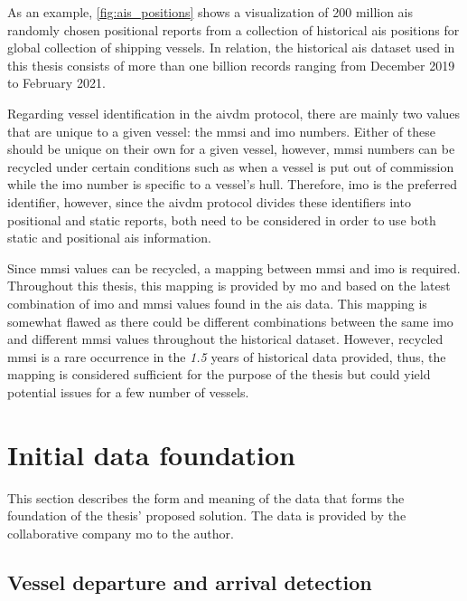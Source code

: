 As an example, \cref{fig:ais_positions} shows a visualization of 200 million \acrshort{ais} randomly chosen positional reports from a collection of historical \acrshort{ais} positions for global collection of shipping vessels. In relation, the historical \acrshort{ais} dataset used in this thesis consists of more than one billion records ranging from December 2019 to February 2021.

Regarding vessel identification in the \gls{aivdm} protocol, there are mainly two values that are unique to a given vessel: the \acrshort{mmsi} and \acrshort{imo} numbers. Either of these should be unique on their own for a given vessel, however, \acrshort{mmsi} numbers can be recycled under certain conditions such as when a vessel is put out of commission while the \acrshort{imo} number is specific to a vessel's hull. Therefore, \acrshort{imo} is the preferred identifier, however, since the \gls{aivdm} protocol divides these identifiers into positional and static reports, both need to be considered in order to use both static and positional \acrshort{ais} information.

Since \acrshort{mmsi} values can be recycled, a mapping between \acrshort{mmsi} and \acrshort{imo} is required. Throughout this thesis, this mapping is provided by \acrfull{mo} and based on the latest combination of \acrshort{imo} and \acrshort{mmsi} values found in the \acrshort{ais} data. This mapping is somewhat flawed as there could be different combinations between the same \acrshort{imo} and different \acrshort{mmsi} values throughout the historical dataset. However, recycled \acrshort{mmsi} is a rare occurrence in the \textit{1.5} years of historical data provided, thus, the mapping is considered sufficient for the purpose of the thesis but could yield potential issues for a few number of vessels.

\section{Initial data foundation}
\label{sec:initial_data_foundation}

This section describes the form and meaning of the data that forms the foundation of the thesis' proposed solution. The data is provided by the collaborative company \acrfull{mo} to the author.

\subsection{Vessel departure and arrival detection}
\label{sec:vessel_transitions}

